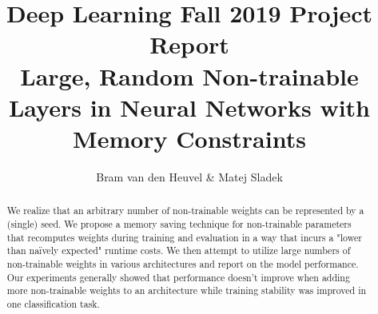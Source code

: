 \documentclass[]{article}
\title{Deep Learning Fall 2019 Project Report\\\large{Large, Random Non-trainable Layers in Neural Networks with Memory Constraints}}
\author{Bram van den Heuvel \& Matej Sladek}
\begin{document}
\maketitle

\begin{abstract}
	We realize that an arbitrary number of non-trainable weights can be represented by a (single) seed. We propose a memory saving technique for non-trainable parameters that recomputes weights during training and evaluation in a way that incurs a "lower than na\"ively expected" runtime costs. We then attempt to utilize large numbers of non-trainable weights in various architectures and report on the model performance. Our experiments generally showed that performance doesn't improve when adding more non-trainable weights to an architecture while training stability was improved in one classification task.
\end{abstract}
\end{document}
